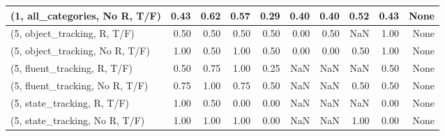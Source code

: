\begin{table*}[h!]
\begin{adjustbox}{width=2\columnwidth,center}
\begin{tabular}{lrrr|rrr|rrr}
(1, all\_categories, No R, T/F)       &                      0.43 &                  0.62 &                      0.57 &                          0.29 &                      0.40 &                          0.40 &                                   0.52 &                               0.43 &                                  None \\



\midrule
(5, object\_tracking, R, T/F)         &                      0.50 &                  0.50 &                      0.50 &                          0.50 &                      0.00 &                          0.50 &                                    NaN &                               1.00 &                                  None \\
(5, object\_tracking, No R, T/F)      &                      1.00 &                  0.50 &                      1.00 &                          0.50 &                      0.00 &                          0.00 &                                   0.50 &                               1.00 &                                  None \\
(5, fluent\_tracking, R, T/F)         &                      0.50 &                  0.75 &                      1.00 &                          0.25 &                       NaN &                           NaN &                                    NaN &                               0.50 &                                  None \\
(5, fluent\_tracking, No R, T/F)      &                      0.75 &                  1.00 &                      0.75 &                          0.50 &                       NaN &                           NaN &                                   0.50 &                               0.50 &                                  None \\
(5, state\_tracking, R, T/F)          &                      1.00 &                  0.50 &                      0.00 &                          0.00 &                       NaN &                           NaN &                                    NaN &                               0.00 &                                  None \\
(5, state\_tracking, No R, T/F)       &                      1.00 &                  1.00 &                      1.00 &                          0.00 &                       NaN &                           NaN &                                   1.00 &                               0.00 &                                  None \\

\end{tabular}
\end{adjustbox}
\end{table*}

